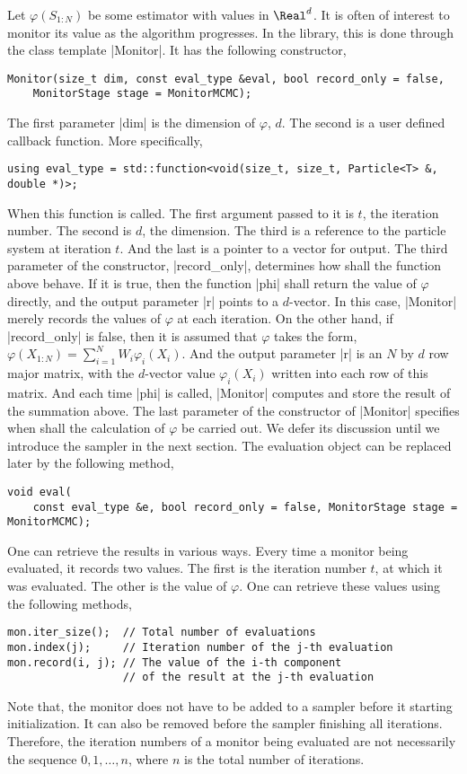 Let $\varphi(S_{1:N})$ be some estimator with values in $\Real^d$. It is often
of interest to monitor its value as the algorithm progresses. In the library,
this is done through the class template |Monitor|. It has the following
constructor,
\begin{verbatim}
Monitor(size_t dim, const eval_type &eval, bool record_only = false,
    MonitorStage stage = MonitorMCMC);
\end{verbatim}
The first parameter |dim| is the dimension of $\varphi$, $d$. The second is a
user defined callback function. More specifically,
\begin{verbatim}
using eval_type = std::function<void(size_t, size_t, Particle<T> &, double *)>;
\end{verbatim}
When this function is called. The first argument passed to it is $t$, the
iteration number. The second is $d$, the dimension. The third is a reference to
the particle system at iteration $t$. And the last is a pointer to a vector for
output. The third parameter of the constructor, |record_only|, determines how
shall the function above behave. If it is true, then the function |phi| shall
return the value of $\varphi$ directly, and the output parameter |r| points to
a $d$-vector. In this case, |Monitor| merely records the values of $\varphi$ at
each iteration. On the other hand, if |record_only| is false, then it is
assumed that $\varphi$ takes the form, $\varphi(X_{1:N}) = \sum_{i=1}^N W_i
\varphi_i(X_i)$. And the output parameter |r| is an $N$ by $d$ row major
matrix, with the $d$-vector value $\varphi_i(X_i)$ written into each row of
this matrix. And each time |phi| is called, |Monitor| computes and store the
result of the summation above. The last parameter of the constructor of
|Monitor| specifies when shall the calculation of $\varphi$ be carried out. We
defer its discussion until we introduce the sampler in the next section. The
evaluation object can be replaced later by the following method,
\begin{verbatim}
void eval(
    const eval_type &e, bool record_only = false, MonitorStage stage = MonitorMCMC);
\end{verbatim}
One can retrieve the results in various ways. Every time a monitor being
evaluated, it records two values. The first is the iteration number $t$, at
which it was evaluated. The other is the value of $\varphi$. One can retrieve
these values using the following methods,
\begin{verbatim}
mon.iter_size();  // Total number of evaluations
mon.index(j);     // Iteration number of the j-th evaluation
mon.record(i, j); // The value of the i-th component
                  // of the result at the j-th evaluation
\end{verbatim}
Note that, the monitor does not have to be added to a sampler before it
starting initialization. It can also be removed before the sampler finishing
all iterations. Therefore, the iteration numbers of a monitor being evaluated
are not necessarily the sequence $0,1,\dots,n$, where $n$ is the total number
of iterations.

